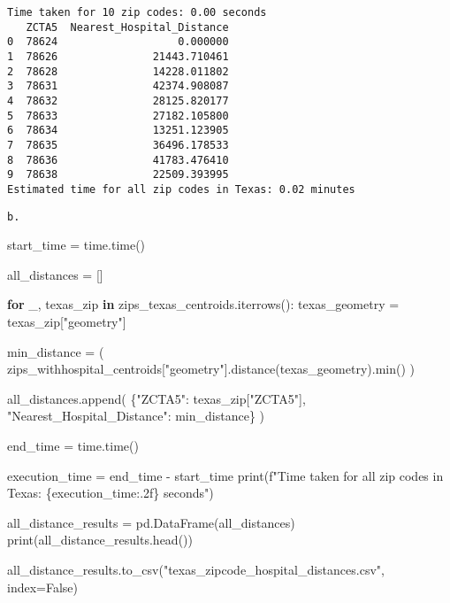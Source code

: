 \documentclass[
  letterpaper,
  DIV=11,
  numbers=noendperiod]{scrartcl}
\newenvironment{Shaded}{\begin{snugshade}}{\end{snugshade}}
\newcommand{\BuiltInTok}[1]{\textcolor[rgb]{0.00,0.23,0.31}{#1}}
\newcommand{\ControlFlowTok}[1]{\textcolor[rgb]{0.00,0.23,0.31}{\textbf{#1}}}
\newcommand{\KeywordTok}[1]{\textcolor[rgb]{0.00,0.23,0.31}{\textbf{#1}}}
\newcommand{\NormalTok}[1]{\textcolor[rgb]{0.00,0.23,0.31}{#1}}
\newcommand{\OperatorTok}[1]{\textcolor[rgb]{0.37,0.37,0.37}{#1}}
\newcommand{\SpecialCharTok}[1]{\textcolor[rgb]{0.37,0.37,0.37}{#1}}
\newcommand{\SpecialStringTok}[1]{\textcolor[rgb]{0.13,0.47,0.30}{#1}}
\newcommand{\StringTok}[1]{\textcolor[rgb]{0.13,0.47,0.30}{#1}}
\newcommand{\VariableTok}[1]{\textcolor[rgb]{0.07,0.07,0.07}{#1}}
\begin{document}
\begin{verbatim}
Time taken for 10 zip codes: 0.00 seconds
   ZCTA5  Nearest_Hospital_Distance
0  78624                   0.000000
1  78626               21443.710461
2  78628               14228.011802
3  78631               42374.908087
4  78632               28125.820177
5  78633               27182.105800
6  78634               13251.123905
7  78635               36496.178533
8  78636               41783.476410
9  78638               22509.393995
Estimated time for all zip codes in Texas: 0.02 minutes
\end{verbatim}

\begin{verbatim}
b.
\end{verbatim}

\begin{Shaded}
\begin{Highlighting}[]
\NormalTok{start\_time }\OperatorTok{=}\NormalTok{ time.time()}

\NormalTok{all\_distances }\OperatorTok{=}\NormalTok{ []}

\ControlFlowTok{for}\NormalTok{ \_, texas\_zip }\KeywordTok{in}\NormalTok{ zips\_texas\_centroids.iterrows():}
\NormalTok{    texas\_geometry }\OperatorTok{=}\NormalTok{ texas\_zip[}\StringTok{"geometry"}\NormalTok{]}

\NormalTok{    min\_distance }\OperatorTok{=}\NormalTok{ (}
\NormalTok{        zips\_withhospital\_centroids[}\StringTok{"geometry"}\NormalTok{].distance(texas\_geometry).}\BuiltInTok{min}\NormalTok{()}
\NormalTok{    )}

\NormalTok{    all\_distances.append(}
\NormalTok{        \{}\StringTok{"ZCTA5"}\NormalTok{: texas\_zip[}\StringTok{"ZCTA5"}\NormalTok{], }\StringTok{"Nearest\_Hospital\_Distance"}\NormalTok{: min\_distance\}}
\NormalTok{    )}

\NormalTok{end\_time }\OperatorTok{=}\NormalTok{ time.time()}

\NormalTok{execution\_time }\OperatorTok{=}\NormalTok{ end\_time }\OperatorTok{{-}}\NormalTok{ start\_time}
\BuiltInTok{print}\NormalTok{(}\SpecialStringTok{f"Time taken for all zip codes in Texas: }\SpecialCharTok{\{}\NormalTok{execution\_time}\SpecialCharTok{:.2f\}}\SpecialStringTok{ seconds"}\NormalTok{)}

\NormalTok{all\_distance\_results }\OperatorTok{=}\NormalTok{ pd.DataFrame(all\_distances)}
\BuiltInTok{print}\NormalTok{(all\_distance\_results.head())}

\NormalTok{all\_distance\_results.to\_csv(}\StringTok{"texas\_zipcode\_hospital\_distances.csv"}\NormalTok{, index}\OperatorTok{=}\VariableTok{False}\NormalTok{)}


\end{Highlighting}
\end{Shaded}
\end{document}
